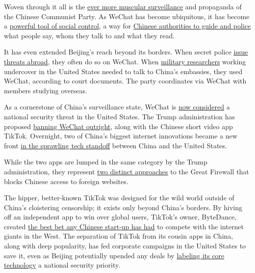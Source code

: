 Woven through it all is the
\href{https://www.nytimes3xbfgragh.onion/2018/07/08/business/china-surveillance-technology.html}{ever
more muscular surveillance} and propaganda of the Chinese Communist
Party. As WeChat has become ubiquitous, it has become a
\href{https://www.nytimes3xbfgragh.onion/2020/03/16/business/china-coronavirus-internet-police.html}{powerful
tool of social control}, a way for
\href{https://www.nytimes3xbfgragh.onion/2019/12/17/technology/china-surveillance.html}{Chinese
authorities to guide and police} what people say, whom they talk to and
what they read.

It has even extended Beijing's reach beyond its borders. When secret
police
\href{https://www.nytimes3xbfgragh.onion/2019/08/15/podcasts/the-daily/china-xinjiang-uighur-detention.html}{issue
threats abroad}, they often do so on WeChat. When
\href{https://www.nytimes3xbfgragh.onion/2020/07/22/world/asia/us-china-houston-consulate.html}{military
researchers} working undercover in the United States needed to talk to
China's embassies, they used WeChat, according to court documents. The
party coordinates via WeChat with members studying overseas.

As a cornerstone of China's surveillance state, WeChat is
\href{https://www.nytimes3xbfgragh.onion/2020/08/07/business/trump-china-wechat-tiktok.html}{now
considered} a national security threat in the United States. The Trump
administration has proposed
\href{https://www.nytimes3xbfgragh.onion/2020/08/06/technology/trump-wechat-tiktok-china.html}{banning
WeChat outright}, along with the Chinese short video app TikTok.
Overnight, two of China's biggest internet innovations became a new
front
\href{https://www.nytimes3xbfgragh.onion/2020/08/17/technology/trump-tiktok-wechat-ban.html}{in
the sprawling tech standoff} between China and the United States.

While the two apps are lumped in the same category by the Trump
administration, they represent
\href{https://www.nytimes3xbfgragh.onion/2016/08/10/technology/china-homegrown-internet-companies-rest-of-the-world.html}{two
distinct approaches} to the Great Firewall that blocks Chinese access to
foreign websites.

The hipper, better-known TikTok was designed for the wild world outside
of China's cloistering censorship; it exists only beyond China's
borders. By hiving off an independent app to win over global users,
TikTok's owner, ByteDance, created
\href{https://www.nytimes3xbfgragh.onion/2020/08/03/technology/tiktok-bytedance-us-china.html}{the
best bet any Chinese start-up has had} to compete with the internet
giants in the West. The separation of TikTok from its cousin apps in
China, along with deep popularity, has fed corporate campaigns in the
United States to save it, even as Beijing potentially upended any deals
by
\href{https://www.nytimes3xbfgragh.onion/2020/08/29/technology/china-tiktok-export-controls.html}{labeling
its core technology} a national security priority.

